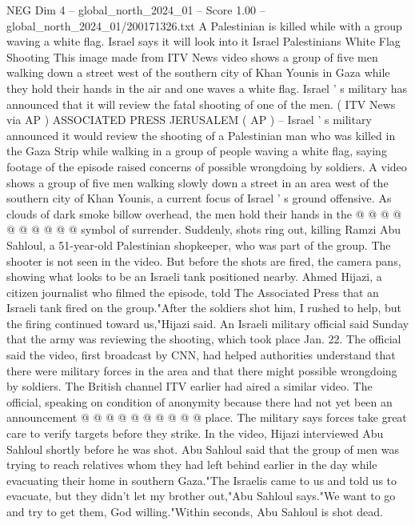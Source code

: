 \begin{textsample}{NEG Dim 4 – global\_north\_2024\_01 – Score 1.00 – global\_north\_2024\_01/200171326.txt}  \label{ex:f4_neg_115}
A Palestinian is killed while with a group waving a white flag.
Israel says it will look into it Israel Palestinians White Flag Shooting This image made from ITV News video shows a group of five men walking down a street west of the southern city of Khan Younis in Gaza while they hold their hands in the air and one waves a white flag.
Israel ' s military has announced that it will review the fatal shooting of one of the men. ( ITV News via AP ) ASSOCIATED PRESS JERUSALEM ( AP ) -- Israel ' s military announced it would review the shooting of a Palestinian man who was killed in the Gaza Strip while walking in a group of people waving a white flag, saying footage of the episode raised concerns of possible wrongdoing by soldiers.
A video shows a group of five men walking slowly down a street in an area west of the southern city of Khan Younis, a current focus of Israel ' s ground offensive.
As clouds of dark smoke billow overhead, the men hold their hands in the @ @ @ @ @ @ @ @ @ @ symbol of surrender.
Suddenly, shots ring out, killing Ramzi Abu Sahloul, a 51-year-old Palestinian shopkeeper, who was part of the group.
The shooter is not seen in the video.
But before the shots are fired, the camera pans, showing what looks to be an Israeli tank positioned nearby.
Ahmed Hijazi, a citizen journalist who filmed the episode, told The Associated Press that an Israeli tank fired on the group."After the soldiers shot him, I rushed to help, but the firing continued toward us,"Hijazi said.
An Israeli military official said Sunday that the army was reviewing the shooting, which took place Jan. 22.
The official said the video, first broadcast by CNN, had helped authorities understand that there were military forces in the area and that there might possible wrongdoing by soldiers.
The British channel ITV earlier had aired a similar video.
The official, speaking on condition of anonymity because there had not yet been an announcement @ @ @ @ @ @ @ @ @ @ place.
The military says forces take great care to verify targets before they strike.
In the video, Hijazi interviewed Abu Sahloul shortly before he was shot.
Abu Sahloul said that the group of men was trying to reach relatives whom they had left behind earlier in the day while evacuating their home in southern Gaza."The Israelis came to us and told us to evacuate, but they didn't let my brother out,"Abu Sahloul says."We want to go and try to get them, God willing."Within seconds, Abu Sahloul is shot dead.

\end{textsample}
